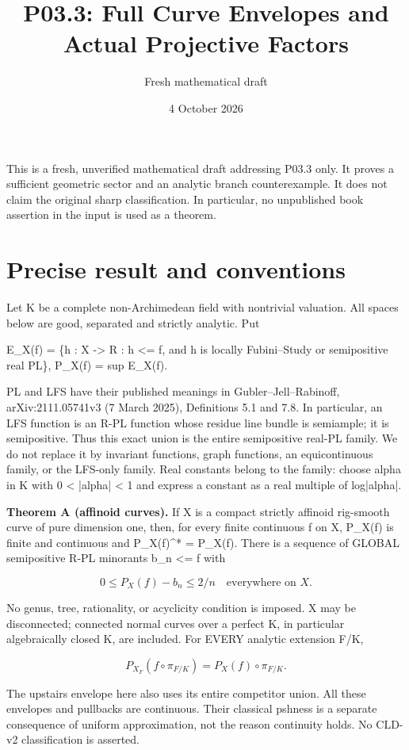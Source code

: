 \documentclass[11pt]{article}
\title{P03.3: Full Curve Envelopes and Actual Projective Factors}
\author{Fresh mathematical draft}
\date{4 October 2026}
\begin{document}
\maketitle
This is a fresh, unverified mathematical draft addressing P03.3 only. It proves a sufficient geometric sector and an analytic branch counterexample. It does not claim the original sharp classification. In particular, no unpublished book assertion in the input is used as a theorem.

\section{Precise result and conventions}

Let K be a complete non-Archimedean field with nontrivial valuation. All spaces below are good, separated and strictly analytic. Put

E\_X(f) = \{h : X -> R : h <= f, and h is locally Fubini–Study or semipositive real PL\}, P\_X(f) = sup E\_X(f).

PL and LFS have their published meanings in Gubler–Jell–Rabinoff, arXiv:2111.05741v3 (7 March 2025), Definitions 5.1 and 7.8. In particular, an LFS function is an R-PL function whose residue line bundle is semiample; it is semipositive. Thus this exact union is the entire semipositive real-PL family. We do not replace it by invariant functions, graph functions, an equicontinuous family, or the LFS-only family. Real constants belong to the family: choose alpha in K with 0 < |alpha| < 1 and express a constant as a real multiple of log|alpha|.

\textbf{Theorem A (affinoid curves).} If X is a compact strictly affinoid rig-smooth curve of pure dimension one, then, for every finite continuous f on X, P\_X(f) is finite and continuous and P\_X(f)\textasciicircum{}* = P\_X(f). There is a sequence of GLOBAL semipositive R-PL minorants b\_n <= f with

\[
0\le P_X(f)-b_n\le 2/n\quad\text{everywhere on }X.
\]

No genus, tree, rationality, or acyclicity condition is imposed. X may be disconnected; connected normal curves over a perfect K, in particular algebraically closed K, are included. For EVERY analytic extension F/K,

\[
P_{X_F}(f\circ\pi_{F/K})=P_X(f)\circ\pi_{F/K}.
\]

The upstairs envelope here also uses its entire competitor union. All these envelopes and pullbacks are continuous. Their classical pshness is a separate consequence of uniform approximation, not the reason continuity holds. No CLD-v2 classification is asserted.
\end{document}
